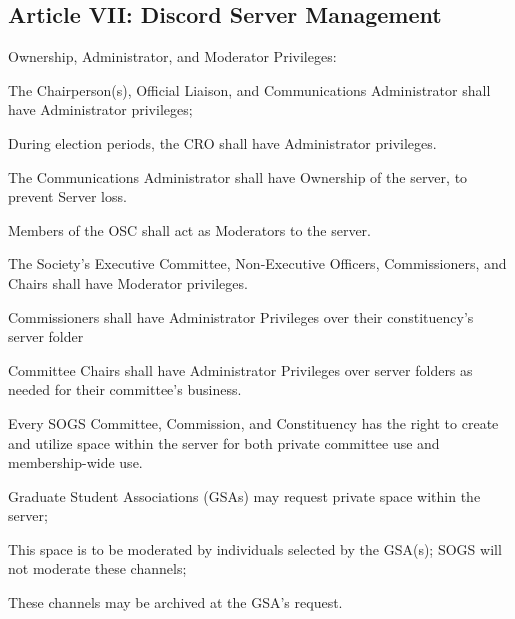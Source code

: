 \subsection{Article VII: Discord Server Management}
\begin{longenum}[ label*=\thesubsection.\arabic*., align=left] 
\item Ownership, Administrator, and Moderator Privileges:
	\begin{longenum}[label*=\arabic*., align=left]
	\item The Chairperson(s), Official Liaison, and Communications Administrator shall have Administrator privileges;
		\begin{longenum}[label*=\arabic*., align=left]
		\item During election periods, the CRO shall have Administrator privileges.
		\end{longenum}
	\item The Communications Administrator shall have Ownership of the server, to prevent Server loss.
	\item Members of the OSC shall act as Moderators to the server.
	\item The Society's Executive Committee, Non-Executive Officers, Commissioners, and Chairs shall have Moderator privileges.
		\begin{longenum}[label*=\arabic*., align=left]
		\item Commissioners shall have Administrator Privileges over their constituency's server folder
		\item Committee Chairs shall have Administrator Privileges over server folders as needed for their committee's business.
		\end{longenum}
	\end{longenum}
\item Every SOGS Committee, Commission, and Constituency has the right to create and utilize space within the server for both private committee use and membership-wide use.
	\begin{longenum}[label*=\arabic*., align=left]
	\item Graduate Student Associations (GSAs) may request private space within the server;
		\begin{longenum}[label*=\arabic*., align=left]
		\item This space is to be moderated by individuals selected by the GSA(s); SOGS will not moderate these channels;
		\item These channels may be archived at the GSA's request.

\end{longenum}
\end{longenum}
\end{longenum}
